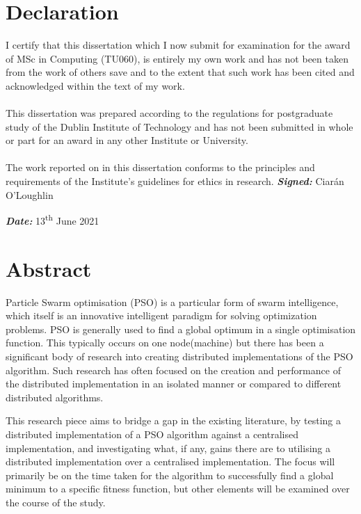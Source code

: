 \documentclass[oneside,12pt]{book}
\begin{document}
\chapter*{Declaration}
I certify that this dissertation which I now submit for examination for the award of
MSc in Computing (TU060), is entirely my own work and has not been taken
from the work of others save and to the extent that such work has been cited and
acknowledged within the text of my work.
\\
\\
This dissertation was prepared according to the regulations for postgraduate study of
the Dublin Institute of Technology and has not been submitted in whole or part for an
award in any other Institute or University.
\\
\\
The work reported on in this dissertation conforms to the principles and requirements
of the Institute’s guidelines for ethics in research.
\vfill
\noindent
\textit{\textbf{Signed:}} Ciarán O'Loughlin 

\noindent
\textit{\textbf{Date:}} 13\textsuperscript{th} June 2021
\vspace{0.8cm}

\chapter*{Abstract}
\par 
Particle Swarm optimisation (PSO) is a particular form of swarm intelligence, which itself is an innovative intelligent paradigm for solving optimization problems. PSO is generally used to find a global optimum in a single optimisation function. This typically occurs on one node(machine) but there has been a significant body of research into creating distributed implementations of the PSO algorithm. Such research has often focused on the creation and performance of the distributed implementation in an isolated manner or compared to different distributed algorithms. 

This research piece aims to bridge a gap in the existing literature, by testing a distributed implementation of a PSO algorithm against a centralised implementation, and investigating what, if any, gains there are to utilising a distributed implementation over a centralised implementation. The focus will primarily be on the time taken for the algorithm to successfully find a global minimum to a specific fitness function, but other elements will be examined over the course of the study.  
\end{document}
